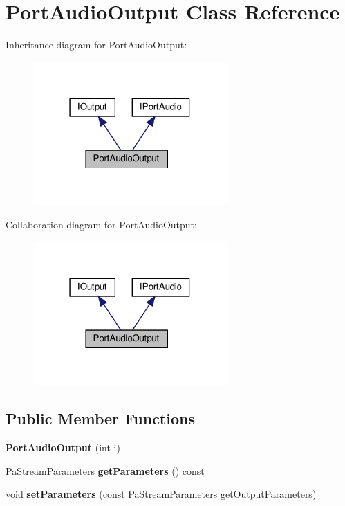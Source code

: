 \hypertarget{class_port_audio_output}{}\section{Port\+Audio\+Output Class Reference}
\label{class_port_audio_output}


Inheritance diagram for Port\+Audio\+Output\+:
\nopagebreak
\begin{figure}[H]
\begin{center}
\leavevmode
\includegraphics[width=210pt]{class_port_audio_output__inherit__graph}
\end{center}
\end{figure}


Collaboration diagram for Port\+Audio\+Output\+:
\nopagebreak
\begin{figure}[H]
\begin{center}
\leavevmode
\includegraphics[width=210pt]{class_port_audio_output__coll__graph}
\end{center}
\end{figure}
\subsection*{Public Member Functions}
\begin{DoxyCompactItemize}
\item 
\mbox{\label{class_port_audio_output_ab50175e3867e2d907ce801ae12534391}} 
{\bfseries Port\+Audio\+Output} (int i)
\item 
\mbox{\label{class_port_audio_output_a4eea0854943fb1bc254bbad6147147da}} 
Pa\+Stream\+Parameters {\bfseries get\+Parameters} () const
\item 
\mbox{\label{class_port_audio_output_a4feee44264636b7b32e502d1e8638778}} 
void {\bfseries set\+Parameters} (const Pa\+Stream\+Parameters get\+Output\+Parameters)
\end{DoxyCompactItemize}


